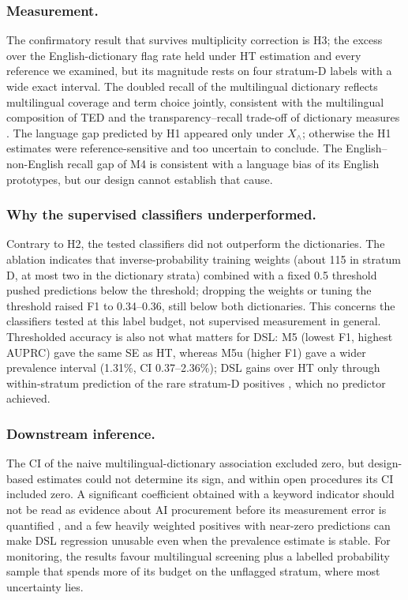 \documentclass[runningheads]{llncs}
\begin{document}
\subsubsection{Measurement.} The confirmatory result that survives multiplicity correction is H3; the excess over the English-dictionary flag rate held under HT estimation and every reference we examined, but its magnitude rests on four stratum-D labels with a wide exact interval. The doubled recall of the multilingual dictionary reflects multilingual coverage and term choice jointly, consistent with the multilingual composition of TED \cite{ahmia2018} and the transparency--recall trade-off of dictionary measures \cite{gentzkow2019}. The language gap predicted by H1 appeared only under $X_\wedge$; otherwise the H1 estimates were reference-sensitive and too uncertain to conclude. The English--non-English recall gap of M4 is consistent with a language bias of its English prototypes, but our design cannot establish that cause.

\subsubsection{Why the supervised classifiers underperformed.} Contrary to H2, the tested classifiers did not outperform the dictionaries. The ablation indicates that inverse-probability training weights (about 115 in stratum D, at most two in the dictionary strata) combined with a fixed 0.5 threshold pushed predictions below the threshold; dropping the weights or tuning the threshold raised F1 to 0.34--0.36, still below both dictionaries. This concerns the classifiers tested at this label budget, not supervised measurement in general. Thresholded accuracy is also not what matters for DSL: M5 (lowest F1, highest AUPRC) gave the same SE as HT, whereas M5u (higher F1) gave a wider prevalence interval (1.31\%, CI 0.37--2.36\%); DSL gains over HT only through within-stratum prediction of the rare stratum-D positives \cite{egami2023,audinet2025}, which no predictor achieved.

\subsubsection{Downstream inference.} The CI of the naive multilingual-dictionary association excluded zero, but design-based estimates could not determine its sign, and within open procedures its CI included zero. A significant coefficient obtained with a keyword indicator should not be read as evidence about AI procurement before its measurement error is quantified \cite{battaglia2025}, and a few heavily weighted positives with near-zero predictions can make DSL regression unusable even when the prevalence estimate is stable. For monitoring, the results favour multilingual screening plus a labelled probability sample that spends more of its budget on the unflagged stratum, where most uncertainty lies.
\end{document}
